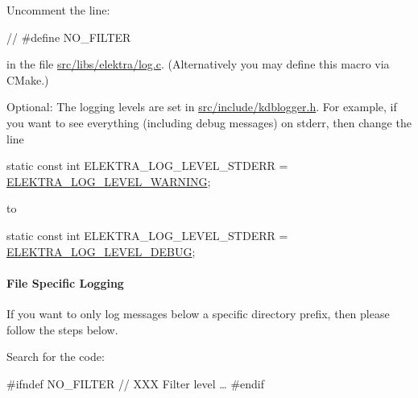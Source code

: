 \begin{DoxyEnumerate}
\item Uncomment the line\+:
\end{DoxyEnumerate}


\begin{DoxyCode}
\textcolor{comment}{// #define NO\_FILTER}
\end{DoxyCode}


in the file {\ttfamily \hyperlink{log_8c}{src/libs/elektra/log.\+c}}. (Alternatively you may define this macro via C\+Make.)


\begin{DoxyEnumerate}
\item Optional\+: The logging levels are set in {\ttfamily \hyperlink{kdblogger_8h}{src/include/kdblogger.\+h}}. For example, if you want to see everything (including debug messages) on stderr, then change the line
\end{DoxyEnumerate}


\begin{DoxyCode}
\textcolor{keyword}{static} \textcolor{keyword}{const} \textcolor{keywordtype}{int} ELEKTRA\_LOG\_LEVEL\_STDERR = \hyperlink{kdblogger_8h_a4096a2ccd61c6f5ad60e9015fd1bbb4ba0524fff5c46e0cf07287c473c46cc8e2}{ELEKTRA\_LOG\_LEVEL\_WARNING};
\end{DoxyCode}


to


\begin{DoxyCode}
\textcolor{keyword}{static} \textcolor{keyword}{const} \textcolor{keywordtype}{int} ELEKTRA\_LOG\_LEVEL\_STDERR = \hyperlink{kdblogger_8h_a4096a2ccd61c6f5ad60e9015fd1bbb4ba24c7a4c44a8b99b978dc99806d083386}{ELEKTRA\_LOG\_LEVEL\_DEBUG};
\end{DoxyCode}


\paragraph*{File Specific Logging}

If you want to only log messages below a specific directory prefix, then please follow the steps below.


\begin{DoxyEnumerate}
\item Search for the code\+:
\end{DoxyEnumerate}


\begin{DoxyCode}
\textcolor{preprocessor}{#ifndef NO\_FILTER}
     \textcolor{comment}{// XXX Filter level …}
\textcolor{preprocessor}{#endif}
\end{DoxyCode}


